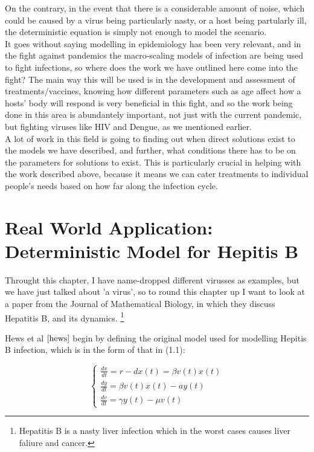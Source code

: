 On the contrary, in the event that there is a considerable amount of noise, which could be caused by a virus being particularly nasty, or a host being partularly ill, the deterministic equation is simply not enough to model the scenario. \\

It goes without saying modelling in epidemiology has been very relevant, and in the fight against pandemics the macro-scaling models of infection are being used to fight infections, so where does the work we have outlined here come into the fight? The main way this will be used is in the development and assessment of treatments/vaccines, knowing how different parameters such as age affect how a hosts' body will respond is very beneficial in this fight, and so the work being done in this area is abundantely important, not just with the current pandemic, but fighting viruses like HIV and Dengue, as we mentioned earlier. \\

A lot of work in this field is going to finding out when direct solutions exist to the models we have described, and further, what conditions there has to be on the parameters for solutions to exist. This is particularly crucial in helping with the work described above, because it means we can cater treatments to individual people's needs based on how far along the infection cycle. \\

\section{Real World Application: Deterministic Model for Hepitis B}
Throught this chapter, I have name-dropped different virusses as examples, but we have just talked about 'a virus', so to round this chapter up I want to look at a paper from the Journal of Mathematical Biology, in which they discuss Hepatitis B, and its dynamics. \footnote{Hepatitis B is a nasty liver infection which in the worst cases causes liver faliure and cancer.} 

Hews et al $\cite{hews}$ begin by defining the original model used for modelling Hepitis B infection, which is in the form of that in (1.1):

\begin{equation}
    \begin{cases}
        \frac{dx}{dt} = r - dx(t) = \beta v(t)x(t) \\
        \frac{dy}{dt} = \beta v(t)x(t) - ay(t) \\
        \frac{dv}{dt} = \gamma y(t) - \mu v(t)
    \end{cases}
\end{equation}


